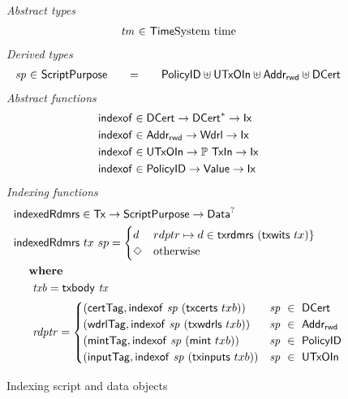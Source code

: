 \begin{figure}[htb]
  \emph{Abstract types}
  \begin{equation*}
    \begin{array}{r@{~\in~}l@{}lr}
      \var{tm}
      & \Time
      & \text{System time}
    \end{array}
  \end{equation*}
  \emph{Derived types}
  \begin{equation*}
    \begin{array}{r@{~\in~}l@{\qquad=\qquad}lr}
      \var{sp}
      & \ScriptPurpose
      & \PolicyID \uniondistinct \UTxOIn \uniondistinct \AddrRWD \uniondistinct \DCert
    \end{array}
  \end{equation*}
  \emph{Abstract functions}
  \begin{align*}
    &\mathsf{indexof} \in \mathsf{DCert} \to \mathsf{DCert}^{*} \to \mathsf{Ix}\\
    &\mathsf{indexof} \in \mathsf{Addr_{rwd}} \to \mathsf{Wdrl} \to \mathsf{Ix}\\
    &\mathsf{indexof} \in \mathsf{UTxOIn} \to \mathbb{P}~\mathsf{TxIn} \to \mathsf{Ix}\\
    &\mathsf{indexof} \in \mathsf{PolicyID} \to \mathsf{Value} \to \mathsf{Ix}
  \end{align*}
  \emph{Indexing functions}
  \begin{align*}
    &\mathsf{indexedRdmrs} \in \mathsf{Tx} \to \mathsf{ScriptPurpose} \to \mathsf{Data}^?\\
    &\mathsf{indexedRdmrs}~tx~sp =
      \begin{cases}
        d & rdptr \mapsto d \in \mathsf{txrdmrs}~(\mathsf{txwits}~{tx}) \} \\
        \Diamond & \text{otherwise}
      \end{cases} \\
    & ~~~ ~ \mathbf{where}~ ~  \\
    & ~~\quad \mathit{txb} = \mathsf{txbody}~ \mathit{tx} \\
    & ~~\quad \mathit{rdptr} = \begin{cases}
        (\mathsf{certTag},\mathsf{indexof}~\mathit{sp}~(\mathsf{txcerts}~{txb}))   & \mathit{sp}~\in~\mathsf{DCert} \\
        (\mathsf{wdrlTag},\mathsf{indexof}~\mathit{sp}~(\mathsf{txwdrls}~{txb}))   & \mathit{sp}~\in~\mathsf{Addr_{rwd}} \\
        (\mathsf{mintTag},\mathsf{indexof}~\mathit{sp}~(\mathsf{mint}~{txb}))    & \mathit{sp}~\in~\mathsf{PolicyID} \\
        (\mathsf{inputTag},\mathsf{indexof}~\mathit{sp}~(\mathsf{txinputs}~{txb})) & \mathit{sp}~\in~\mathsf{UTxOIn}
      \end{cases}
  \end{align*}
  \caption{Indexing script and data objects}
  \label{fig:functions:script1}
\end{figure}


